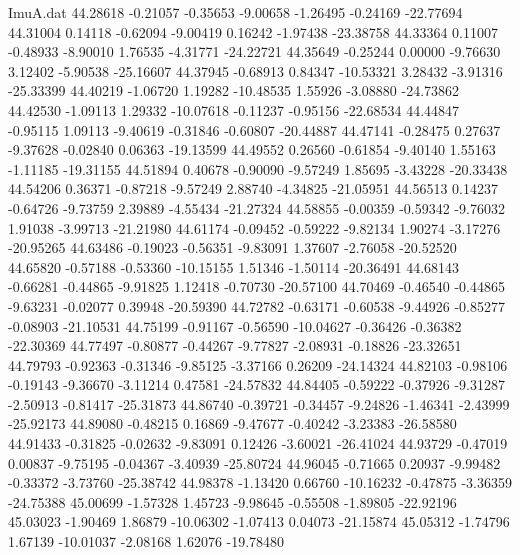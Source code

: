 \begin{filecontents}{ImuA.dat}
  44.28618   -0.21057   -0.35653   -9.00658   -1.26495   -0.24169  -22.77694
  44.31004    0.14118   -0.62094   -9.00419    0.16242   -1.97438  -23.38758
  44.33364    0.11007   -0.48933   -8.90010    1.76535   -4.31771  -24.22721
  44.35649   -0.25244    0.00000   -9.76630    3.12402   -5.90538  -25.16607
  44.37945   -0.68913    0.84347  -10.53321    3.28432   -3.91316  -25.33399
  44.40219   -1.06720    1.19282  -10.48535    1.55926   -3.08880  -24.73862
  44.42530   -1.09113    1.29332  -10.07618   -0.11237   -0.95156  -22.68534
  44.44847   -0.95115    1.09113   -9.40619   -0.31846   -0.60807  -20.44887
  44.47141   -0.28475    0.27637   -9.37628   -0.02840    0.06363  -19.13599
  44.49552    0.26560   -0.61854   -9.40140    1.55163   -1.11185  -19.31155
  44.51894    0.40678   -0.90090   -9.57249    1.85695   -3.43228  -20.33438
  44.54206    0.36371   -0.87218   -9.57249    2.88740   -4.34825  -21.05951
  44.56513    0.14237   -0.64726   -9.73759    2.39889   -4.55434  -21.27324
  44.58855   -0.00359   -0.59342   -9.76032    1.91038   -3.99713  -21.21980
  44.61174   -0.09452   -0.59222   -9.82134    1.90274   -3.17276  -20.95265
  44.63486   -0.19023   -0.56351   -9.83091    1.37607   -2.76058  -20.52520
  44.65820   -0.57188   -0.53360  -10.15155    1.51346   -1.50114  -20.36491
  44.68143   -0.66281   -0.44865   -9.91825    1.12418   -0.70730  -20.57100
  44.70469   -0.46540   -0.44865   -9.63231   -0.02077    0.39948  -20.59390
  44.72782   -0.63171   -0.60538   -9.44926   -0.85277   -0.08903  -21.10531
  44.75199   -0.91167   -0.56590  -10.04627   -0.36426   -0.36382  -22.30369
  44.77497   -0.80877   -0.44267   -9.77827   -2.08931   -0.18826  -23.32651
  44.79793   -0.92363   -0.31346   -9.85125   -3.37166    0.26209  -24.14324
  44.82103   -0.98106   -0.19143   -9.36670   -3.11214    0.47581  -24.57832
  44.84405   -0.59222   -0.37926   -9.31287   -2.50913   -0.81417  -25.31873
  44.86740   -0.39721   -0.34457   -9.24826   -1.46341   -2.43999  -25.92173
  44.89080   -0.48215    0.16869   -9.47677   -0.40242   -3.23383  -26.58580
  44.91433   -0.31825   -0.02632   -9.83091    0.12426   -3.60021  -26.41024
  44.93729   -0.47019    0.00837   -9.75195   -0.04367   -3.40939  -25.80724
  44.96045   -0.71665    0.20937   -9.99482   -0.33372   -3.73760  -25.38742
  44.98378   -1.13420    0.66760  -10.16232   -0.47875   -3.36359  -24.75388
  45.00699   -1.57328    1.45723   -9.98645   -0.55508   -1.89805  -22.92196
  45.03023   -1.90469    1.86879  -10.06302   -1.07413    0.04073  -21.15874
  45.05312   -1.74796    1.67139  -10.01037   -2.08168    1.62076  -19.78480

\end{filecontents}
